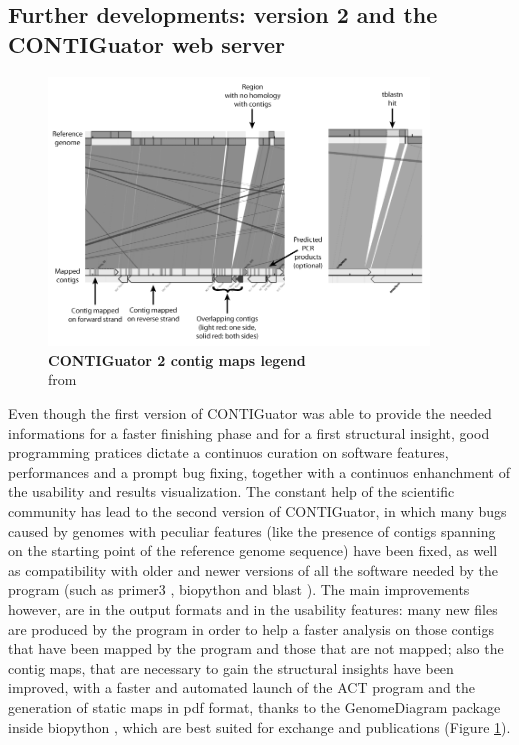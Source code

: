 \subsection{Further developments: version 2 and the CONTIGuator web server}
\begin{figure}[!b]
	\center
    \includegraphics[width=0.9\textwidth]{figures/2/thesis_25}
	\caption{\label{fig:contiguator2}\textbf{CONTIGuator 2 contig maps legend}\\
			from \cite{contiguator}}
\end{figure}

Even though the first version of CONTIGuator was able to provide the needed informations for a faster finishing phase and for a first structural insight, good programming pratices dictate a continuos curation on software features, performances and a prompt bug fixing, together with a continuos enhanchment of the usability and results visualization. The constant help of the scientific community has lead to the second version of CONTIGuator, in which many bugs caused by genomes with peculiar features (like the presence of contigs spanning on the starting point of the reference genome sequence) have been fixed, as well as compatibility with older and newer versions of all the software needed by the program (such as primer3 \cite{rozen2000primer3}, biopython \cite{cock2009biopython} and blast \cite{camacho2009blast+}). The main improvements however, are in the output formats and in the usability features: many new files are produced by the program in order to help a faster analysis on those contigs that have been mapped by the program and those that are not mapped; also the contig maps, that are necessary to gain the structural insights have been improved, with a faster and automated launch of the ACT \cite{carver2005act} program and the generation of static maps in pdf format, thanks to the GenomeDiagram package inside biopython \cite{cock2009biopython}\cite{pritchard2006genomediagram}, which are best suited for exchange and publications (Figure \ref{fig:contiguator2}).

